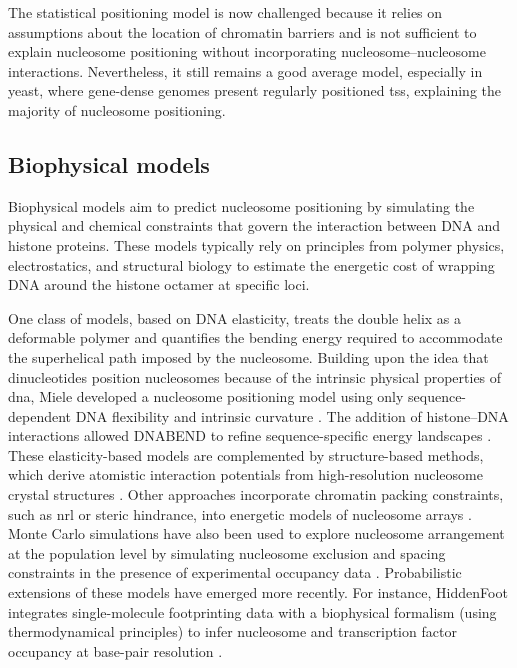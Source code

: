 \documentclass[11pt]{book}
\begin{document}
The statistical positioning model is now challenged because it relies on assumptions about the location of chromatin barriers and is not sufficient to explain nucleosome positioning without incorporating nucleosome–nucleosome interactions. Nevertheless, it still remains a good average model, especially in yeast, where gene-dense genomes present regularly positioned \gls{tss}, explaining the majority of nucleosome positioning.


\subsection{Biophysical models}
Biophysical models aim to predict nucleosome positioning by simulating the physical and chemical constraints that govern the interaction between DNA and histone proteins. These models typically rely on principles from polymer physics, electrostatics, and structural biology to estimate the energetic cost of wrapping DNA around the histone octamer at specific loci.

One class of models, based on DNA elasticity, treats the double helix as a deformable polymer and quantifies the bending energy required to accommodate the superhelical path imposed by the nucleosome. Building upon the idea that dinucleotides position nucleosomes because of the intrinsic physical properties of \gls{dna}, Miele developed a nucleosome positioning model using only sequence-dependent DNA flexibility and intrinsic curvature \cite{miele_dna_2008}. The addition of histone–DNA interactions allowed DNABEND to refine sequence-specific energy landscapes \cite{morozov_using_2009}. These elasticity-based models are complemented by structure-based methods, which derive atomistic interaction potentials from high-resolution nucleosome crystal structures \cite{battistini_structure-based_2012}. Other approaches incorporate chromatin packing constraints, such as \gls{nrl} or steric hindrance, into energetic models of nucleosome arrays \cite{zhang_packing_2011, xi_predicting_2010}. Monte Carlo simulations have also been used to explore nucleosome arrangement at the population level by simulating nucleosome exclusion and spacing constraints in the presence of experimental occupancy data \cite{schopflin_modeling_2013}. Probabilistic extensions of these models have emerged more recently. For instance, HiddenFoot integrates single-molecule footprinting data with a biophysical formalism (using thermodynamical principles) to infer nucleosome and transcription factor occupancy at base-pair resolution \cite{dalakishvili_biophysical_2025}.
\end{document}
